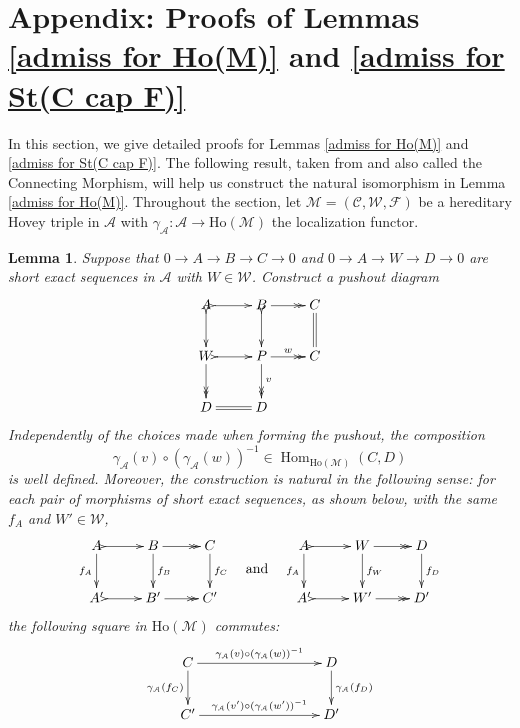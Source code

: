 \documentclass[12pt,twoside]{amsart}
\theoremstyle{bfupright head,slanted body}
\theoremstyle{bfupright head,upright body}
\theoremstyle{fixed bf head,slanted body}
\newtheorem{lem}[res]{Lemma}            \newtheorem*{lem*}{Lemma}
\theoremstyle{fixed bf head,upright body}
\theoremstyle{numbered paragraph}
\newcommand{\lemcite}[2][?]{\cite[Lemma~#1]{#2}}
\numberwithin{equation}{res}
\newcommand{\calC}{\mathcal{C}}
\newcommand{\calW}{\mathcal{W}}
\newcommand{\calF}{\mathcal{F}}
\newcommand{\calA}{\mathcal{A}}
\newcommand{\calM}{\mathcal{M}}
\newcommand{\Ho}{\mathrm{Ho}}
\newcommand{\Hom}{\operatorname{Hom}}
\begin{document}
\appendix
\section*{Appendix: Proofs of Lemmas \ref{admiss for Ho(M)} and \ref{admiss for St(C cap F)}}
\label{appendix}
\noindent
In this section, we give detailed proofs for Lemmas \ref{admiss for Ho(M)} and \ref{admiss for St(C cap F)}. The following result, taken from \lemcite[6.26]{2025GillBook} and also called the Connecting Morphism, will help us construct the natural isomorphism in Lemma \ref{admiss for Ho(M)}. {\sf Throughout the section}, let $\calM = (\calC, \calW, \calF)$ be a hereditary Hovey triple in $\calA$ with $\gamma_{\calA}: \calA \to \Ho(\calM)$ the localization functor.

\begin{lem} \label{The Connecting Mor}
Suppose that $0\to A \to B \to C\to 0$ and $0\to A \to W \to D\to 0$ are short exact sequences in $\calA$ with $W \in \calW$.
Construct a pushout diagram
\[
\xymatrix{
     A
\ar@{>->}[d]
\ar@{>->}[r]
&    B
\ar@{>->}[d]
\ar@{->>}[r]
&    C
\ar@{=}[d]   \\
     W
\ar@{->>}[d]
\ar@{>->}[r]
&    P
\ar@{->>}[d]^(0.45){v}
\ar@{->>}[r]^-{w}
&    C        \\
     D
\ar@{=}[r]
&  D
}
\]
Independently of the choices made when forming the pushout, the composition
\[
\gamma_{\calA}(v) \circ (\gamma_{\calA}(w))^{-1} \in \Hom_{\Ho(\calM)}(C, D)
\]
is well defined.
Moreover, the construction is natural in the following sense: for each pair of morphisms of short exact sequences, as shown below, with the same $f_A$ and $W' \in \calW$,
\[
\xymatrix{
   A
\ar[d]_-{f_A}
\ar@{>->}[r]
&  B
\ar[d]^-{f_B}
\ar@{->>}[r]
&  C \ar[d]^-{f_C}   \\
   A'
\ar@{>->}[r]
&  B'
\ar@{->>}[r]
&  C'               }
\quad \raisebox{-3.8ex}{\text{and}} \quad
\xymatrix{
   A
\ar[d]_-{f_A}
\ar@{>->}[r]
&  W
\ar[d]^-{f_W}
\ar@{->>}[r]
&  D
\ar[d]^-{f_D}   \\
A'
\ar@{>->}[r]
&  W'
\ar@{->>}[r]
&  D'               }
\]
the following square in $\Ho(\calM)$ commutes:
\[
\xymatrix@C=3CM{
  C
\ar[d]_-{\gamma_{\calA}(f_C)}
\ar[r]^-{\gamma_{\calA}(v) \circ (\gamma_{\calA}(w))^{-1}}
& D
\ar[d]^-{\gamma_{\calA}(f_D)}  \\
  C'
\ar[r]^-{\gamma_{\calA}(v') \circ (\gamma_{\calA}(w'))^{-1}}
& D'                      }
\]
\end{lem}
\end{document}
